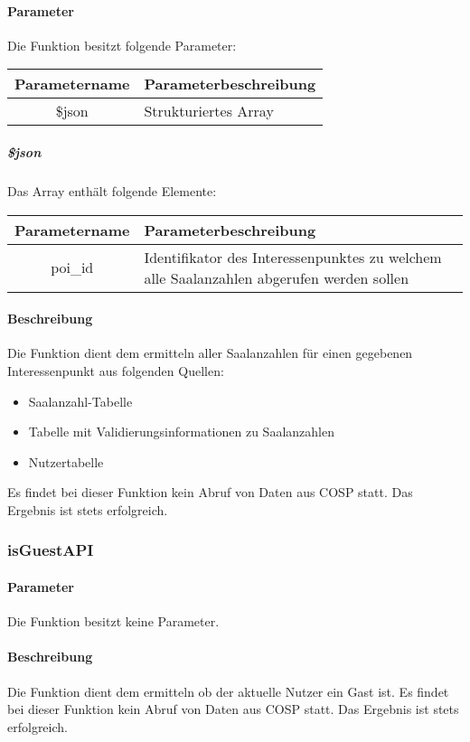 \paragraph{Parameter} Die Funktion besitzt folgende Parameter:
\begin{table}[H]
	\begin{tabular}{|c|p{11cm}|}
		\hline
		\textbf{Parametername} & \textbf{Parameterbeschreibung} \\ \hline
		\$json & Strukturiertes Array \\ \hline
	\end{tabular}
\end{table}
\subparagraph{\$json}Das Array enthält folgende Elemente:
\begin{table}[H]
	\begin{tabular}{|c|p{11cm}|}
		\hline
		\textbf{Parametername} & \textbf{Parameterbeschreibung} \\ \hline
		poi\_id & Identifikator des Interessenpunktes zu welchem alle Saalanzahlen abgerufen werden sollen \\ \hline
	\end{tabular}
\end{table}
\paragraph{Beschreibung} Die Funktion dient dem ermitteln aller Saalanzahlen für einen gegebenen Interessenpunkt aus folgenden Quellen:
\begin{itemize}
	\item Saalanzahl-Tabelle
	\item Tabelle mit Validierungsinformationen zu Saalanzahlen
	\item Nutzertabelle
\end{itemize}
Es findet bei dieser Funktion kein Abruf von Daten aus {\glqq COSP\grqq} statt. Das Ergebnis ist stets erfolgreich.
\subsubsection{isGuestAPI}
\paragraph{Parameter} Die Funktion besitzt keine Parameter.
\paragraph{Beschreibung} Die Funktion dient dem ermitteln ob der aktuelle Nutzer ein Gast ist. Es findet bei dieser Funktion kein Abruf von Daten aus {\glqq COSP\grqq} statt. Das Ergebnis ist stets erfolgreich.
